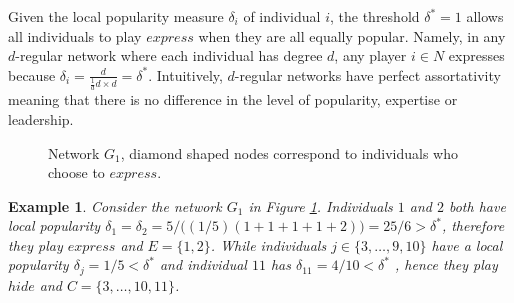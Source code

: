 \documentclass{article}
\newtheorem{example}{Example}
\begin{document}
Given the local popularity measure $\delta_i$ of individual $i$, the threshold $\delta^{*}=1$ allows all individuals to play $express$ when they are all equally popular. Namely, in any $d$-regular network where each individual has degree $d$, any player $i \in N$ expresses because $\delta_{i} = \frac{d}{\frac{1}{d} d \times d}  =\delta^{*}$. Intuitively, $d$-regular networks have perfect assortativity meaning that there is no difference in the level of popularity, expertise or leadership.
\begin{figure}[ht]
\begin{center}
\end{center}
\caption{Network $G_{1}$, diamond shaped nodes correspond to individuals who choose to $express$.}
\label{connectorfigure}
\end{figure}
%
\begin{example} Consider the network $G_{1}$ in Figure \ref{connectorfigure}. Individuals $1$ and $2$ both have local popularity $\delta_1 = \delta_2 = 5 / \big( (1/5) (1+1 +1 +1 + 2) \big) = 25/6 >\delta^{*}$, therefore they play $express$ and $E = \{ 1,2\}$. While individuals $j \in \{ 3, \ldots,  9, 10 \}$ have a local popularity $\delta_j = 1/5 <\delta^{*}$ and individual $11$ has $\delta_{11}=4/10 <\delta^{*} $ , hence they play $hide$ and $C=\{ 3, \ldots, 10,11 \}$.
\end{example}



\end{document}
